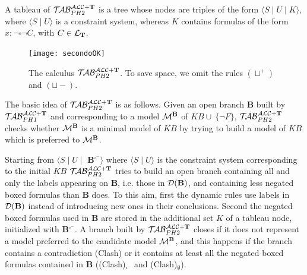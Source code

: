 \documentclass[a4paper, 11pt, oneside]{duthesis}
\newcommand{\tip}{{\bf T}}
\newcommand{\hide}[1]{}
\newcommand{\unione} {\cup}
\newcommand{\vuoto} {\emptyset}
\newcommand{\nott} {\lnot}
\newcommand{\tc} {\mid}
\newcommand{\bbox}{\square}
\newcommand{\sx} {\langle}
\newcommand{\dx} {\rangle}
\newcommand{\db}{\mathcal{D}(\mbox{\bf B})}
\newcommand{\ellet} {\mathcal{L}_{\bf T}}
\newcommand{\emme} {\begin{mathcal}M\end{mathcal}}
\newcommand{\primo}{\mathrel{{\mathcal{T}\!\mathcal{AB}}}_{PH 1}^{\mathcal{ALC}+\mbox{\scriptsize $\tip$}}}
\newcommand{\secondo}{\mathrel{{\mathcal{T}\!\mathcal{AB}}}_{PH 2}^{\mathcal{ALC}+\mbox{\scriptsize $\tip$}}}
\begin{document}
\hide{\noindent Intuitively, $\db$ is the set of individual constants and variables occurring in {\bf B}, whereas {\bf B}$^{\bbox^{-}}$ is the set of formulas $x: \nott \bbox \nott C$ occurring in {\bf B}.}

\noindent  A tableau of $\secondo$ is a tree whose nodes are triples of the form $\sx S \tc U \tc K \dx$, where $\sx S \tc U \dx$ is a constraint system, whereas $K$ contains formulas of the form $x: \nott \bbox \nott C$, with $C \in \ellet$.

\begin{figure}[t]
{\centerline{
\texttt{[image: secondoOK]}} }
\caption{The calculus $\secondo$. To save space, we omit the rules $(\sqcup^+)$ and $(\sqcup-)$.}\label{immagine secondo}
\end{figure}




The basic idea of $\secondo$ is as follows. Given an open branch {\bf B} built by $\primo$ and corresponding to a model $\emme^{\bf B}$ of $KB \unione \ \{\nott F\}$, $\secondo$ checks whether $\emme^{\bf B}$ is a minimal model of $KB$ by trying to build a model of $KB$ which is preferred to $\emme^{\bf B}$.
\hide{Checking (un)satisfiability of , allows to verify whether the candidate model $\emme^{\bf B}$ is minimal.}
Starting from $\sx S \tc U \tc$ {\bf B}$^{\bbox^-} \dx$ where $\sx S \tc U \dx$ is the  constraint system corresponding to the initial $KB$ $\secondo$ tries to build an open branch containing  all and only the labels appearing on {\bf B}, i.e. those in $\db$, and containing less negated boxed formulas than {\bf B} does.
To this aim, first the dynamic rules use labels in $\db$ instead of introducing new ones in their conclusions.
Second the negated boxed formulas used in {\bf B} are stored in  the additional set $K$ of a tableau node, initialized with {\bf B}$^{\bbox^-}$.
A branch built by $\secondo$ closes if it does not represent a model preferred to the candidate model $\emme^{\bf B}$, and this happens if the branch contains a contradiction (Clash) or it contains at least all the negated boxed formulas contained in {\bf B} ((Clash)$_{\bbox^{-}}$ and (Clash)$_{\vuoto}$).
\end{document}
